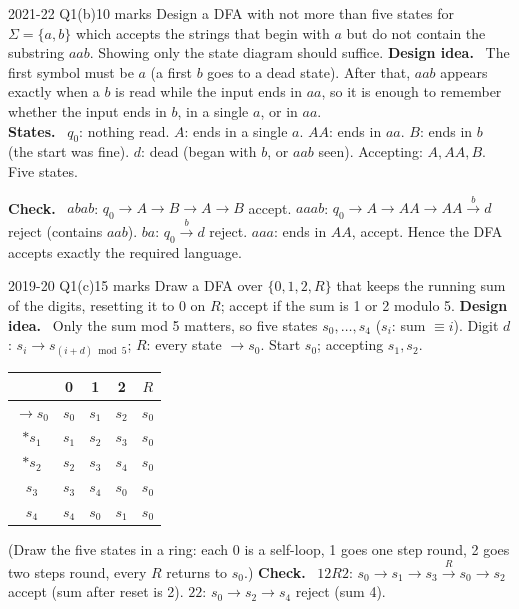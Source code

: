 \documentclass[10.5pt,a4paper]{article}
\newcommand{\ansh}[1]{\textbf{\color{exborder}#1}\ }
\begin{document}
\begin{examq}{2021-22 Q1(b)}{10 marks}
Design a DFA with not more than five states for $\Sigma=\{a,b\}$ which accepts the strings that begin with $a$ but do not contain the substring
$aab$. Showing only the state diagram should suffice.
\tcblower
\ansh{Design idea.} The first symbol must be $a$ (a first $b$ goes to a dead state). After that, $aab$ appears exactly when a $b$ is read while
the input ends in $aa$, so it is enough to remember whether the input ends in $b$, in a single $a$, or in $aa$.\\
\ansh{States.} $q_0$: nothing read. $A$: ends in a single $a$. $AA$: ends in $aa$. $B$: ends in $b$ (the start was fine). $d$: dead (began
with $b$, or $aab$ seen). Accepting: $A,AA,B$. Five states.
\begin{center}
\end{center}
\ansh{Check.} $abab$: $q_0\to A\to B\to A\to B$ accept. $aaab$: $q_0\to A\to AA\to AA\xrightarrow{b}d$ reject (contains $aab$).
$ba$: $q_0\xrightarrow{b}d$ reject. $aaa$: ends in $AA$, accept. Hence the DFA accepts exactly the required language.
\end{examq}

\begin{examq}{2019-20 Q1(c)}{15 marks}
Draw a DFA over $\{0,1,2,R\}$ that keeps the running sum of the digits, resetting it to 0 on $R$; accept if the sum is 1 or 2 modulo 5.
\tcblower
\ansh{Design idea.} Only the sum mod 5 matters, so five states $s_0,\dots,s_4$ ($s_i$: sum $\equiv i$). Digit $d$: $s_i\to s_{(i+d)\bmod5}$;
$R$: every state $\to s_0$. Start $s_0$; accepting $s_1,s_2$.
\begin{center}\small
\begin{tabular}{c|cccc}
 & 0 & 1 & 2 & $R$\\\hline
$\to s_0$ & $s_0$ & $s_1$ & $s_2$ & $s_0$\\
$*s_1$ & $s_1$ & $s_2$ & $s_3$ & $s_0$\\
$*s_2$ & $s_2$ & $s_3$ & $s_4$ & $s_0$\\
$s_3$ & $s_3$ & $s_4$ & $s_0$ & $s_0$\\
$s_4$ & $s_4$ & $s_0$ & $s_1$ & $s_0$
\end{tabular}
\end{center}
(Draw the five states in a ring: each 0 is a self-loop, 1 goes one step round, 2 goes two steps round, every $R$ returns to $s_0$.)
\ansh{Check.} $12R2$: $s_0\to s_1\to s_3\xrightarrow{R}s_0\to s_2$ accept (sum after reset is 2). $22$: $s_0\to s_2\to s_4$ reject (sum 4).
\end{examq}
\end{document}
